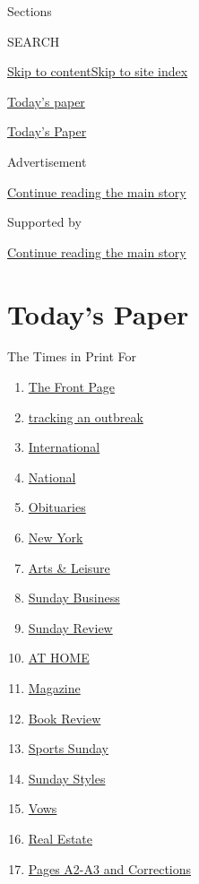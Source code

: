 Sections

SEARCH

\protect\hyperlink{site-content}{Skip to
content}\protect\hyperlink{site-index}{Skip to site index}

\href{https://www.nytimes3xbfgragh.onion/section/todayspaper}{Today's
paper}

\href{https://myaccount.nytimes3xbfgragh.onion/auth/login?response_type=cookie\&client_id=vi}{}

\href{https://www.nytimes3xbfgragh.onion/section/todayspaper}{Today's
Paper}

Advertisement

\protect\hyperlink{after-top}{Continue reading the main story}

Supported by

\protect\hyperlink{after-sponsor}{Continue reading the main story}

\hypertarget{todays-paper}{%
\section{Today's Paper}\label{todays-paper}}

The Times in Print For

\begin{enumerate}
\def\labelenumi{\arabic{enumi}.}
\tightlist
\item
  \protect\hyperlink{thefrontpage}{The Front Page}
\item
  \protect\hyperlink{trackinganoutbreak}{tracking an outbreak}
\item
  \protect\hyperlink{international}{International}
\item
  \protect\hyperlink{national}{National}
\item
  \protect\hyperlink{obituaries}{Obituaries}
\item
  \protect\hyperlink{newyork}{New York}
\item
  \protect\hyperlink{artsux5cux26leisure}{Arts \& Leisure}
\item
  \protect\hyperlink{sundaybusiness}{Sunday Business}
\item
  \protect\hyperlink{sundayreview}{Sunday Review}
\item
  \protect\hyperlink{athome}{AT HOME}
\item
  \protect\hyperlink{magazine}{Magazine}
\item
  \protect\hyperlink{bookreview}{Book Review}
\item
  \protect\hyperlink{sportssunday}{Sports Sunday}
\item
  \protect\hyperlink{sundaystyles}{Sunday Styles}
\item
  \protect\hyperlink{vows}{Vows}
\item
  \protect\hyperlink{realestate}{Real Estate}
\item
  \protect\hyperlink{pagesa2-a3andcorrections}{Pages A2-A3 and
  Corrections}
\end{enumerate}

